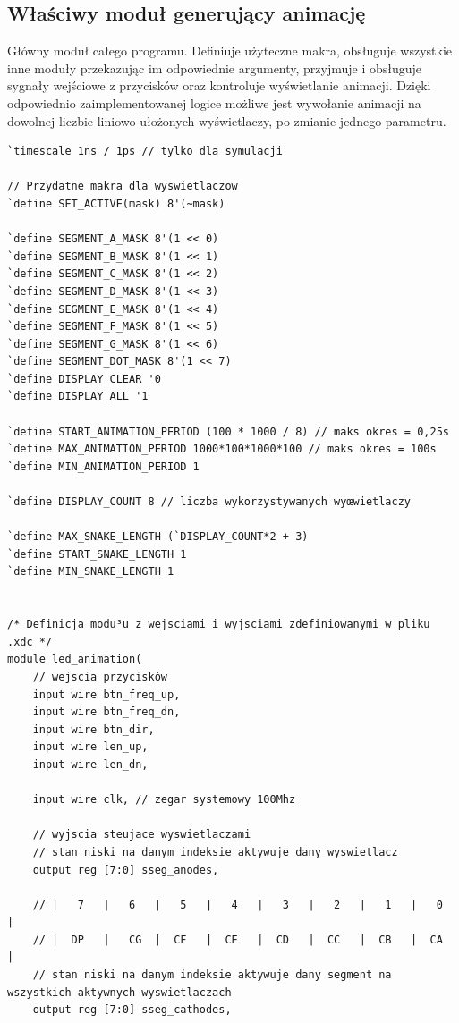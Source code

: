 \documentclass[a4paper]{article}
\begin{document}
\subsection{Właściwy moduł generujący animację}
Główny moduł całego programu. Definiuje użyteczne makra, obsługuje wszystkie inne moduły
przekazując im odpowiednie argumenty,
przyjmuje i obsługuje sygnały wejściowe z przycisków oraz kontroluje
wyświetlanie animacji.
Dzięki odpowiednio zaimplementowanej logice możliwe jest wywołanie animacji na dowolnej liczbie liniowo ułożonych 
wyświetlaczy, po zmianie jednego parametru. 


\begin{verbatim}
`timescale 1ns / 1ps // tylko dla symulacji

// Przydatne makra dla wyswietlaczow
`define SET_ACTIVE(mask) 8'(~mask)

`define SEGMENT_A_MASK 8'(1 << 0)
`define SEGMENT_B_MASK 8'(1 << 1)
`define SEGMENT_C_MASK 8'(1 << 2)
`define SEGMENT_D_MASK 8'(1 << 3)
`define SEGMENT_E_MASK 8'(1 << 4)
`define SEGMENT_F_MASK 8'(1 << 5)
`define SEGMENT_G_MASK 8'(1 << 6)
`define SEGMENT_DOT_MASK 8'(1 << 7)
`define DISPLAY_CLEAR '0
`define DISPLAY_ALL '1

`define START_ANIMATION_PERIOD (100 * 1000 / 8) // maks okres = 0,25s
`define MAX_ANIMATION_PERIOD 1000*100*1000*100 // maks okres = 100s
`define MIN_ANIMATION_PERIOD 1

`define DISPLAY_COUNT 8 // liczba wykorzystywanych wyœwietlaczy

`define MAX_SNAKE_LENGTH (`DISPLAY_COUNT*2 + 3)
`define START_SNAKE_LENGTH 1
`define MIN_SNAKE_LENGTH 1


/* Definicja modu³u z wejsciami i wyjsciami zdefiniowanymi w pliku .xdc */
module led_animation(
    // wejscia przycisków
    input wire btn_freq_up,
    input wire btn_freq_dn,
    input wire btn_dir,
    input wire len_up,
    input wire len_dn,
    
    input wire clk, // zegar systemowy 100Mhz
    
    // wyjscia steujace wyswietlaczami
    // stan niski na danym indeksie aktywuje dany wyswietlacz
    output reg [7:0] sseg_anodes,
    
    // |   7   |   6   |   5   |   4   |   3   |   2   |   1   |   0   |
    // |  DP   |   CG  |  CF   |  CE   |  CD   |  CC   |  CB   |  CA   |
    // stan niski na danym indeksie aktywuje dany segment na wszystkich aktywnych wyswietlaczach
    output reg [7:0] sseg_cathodes,
    

\end{verbatim}
\end{document}
